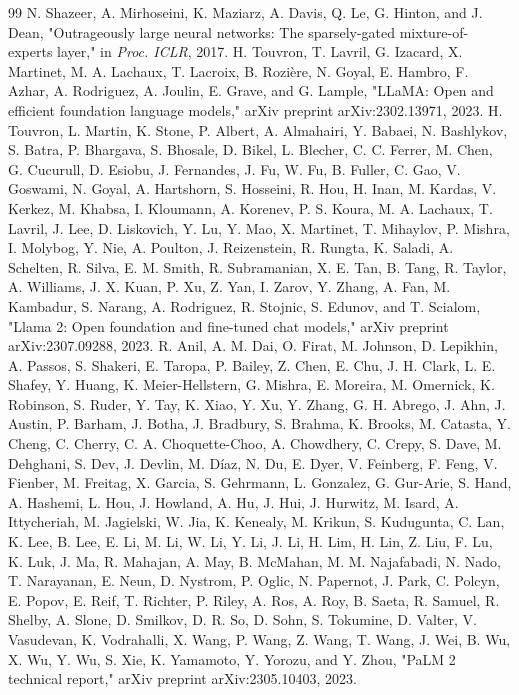 \documentclass[journal]{IEEEtran}
\begin{document}
\begin{thebibliography}{99}
N. Shazeer, A. Mirhoseini, K. Maziarz, A. Davis, Q. Le, G. Hinton, and J. Dean, "Outrageously large neural networks: The sparsely-gated mixture-of-experts layer," in \textit{Proc. ICLR}, 2017.
H. Touvron, T. Lavril, G. Izacard, X. Martinet, M. A. Lachaux, T. Lacroix, B. Rozière, N. Goyal, E. Hambro, F. Azhar, A. Rodriguez, A. Joulin, E. Grave, and G. Lample, "LLaMA: Open and efficient foundation language models," arXiv preprint arXiv:2302.13971, 2023.
H. Touvron, L. Martin, K. Stone, P. Albert, A. Almahairi, Y. Babaei, N. Bashlykov, S. Batra, P. Bhargava, S. Bhosale, D. Bikel, L. Blecher, C. C. Ferrer, M. Chen, G. Cucurull, D. Esiobu, J. Fernandes, J. Fu, W. Fu, B. Fuller, C. Gao, V. Goswami, N. Goyal, A. Hartshorn, S. Hosseini, R. Hou, H. Inan, M. Kardas, V. Kerkez, M. Khabsa, I. Kloumann, A. Korenev, P. S. Koura, M. A. Lachaux, T. Lavril, J. Lee, D. Liskovich, Y. Lu, Y. Mao, X. Martinet, T. Mihaylov, P. Mishra, I. Molybog, Y. Nie, A. Poulton, J. Reizenstein, R. Rungta, K. Saladi, A. Schelten, R. Silva, E. M. Smith, R. Subramanian, X. E. Tan, B. Tang, R. Taylor, A. Williams, J. X. Kuan, P. Xu, Z. Yan, I. Zarov, Y. Zhang, A. Fan, M. Kambadur, S. Narang, A. Rodriguez, R. Stojnic, S. Edunov, and T. Scialom, "Llama 2: Open foundation and fine-tuned chat models," arXiv preprint arXiv:2307.09288, 2023.
R. Anil, A. M. Dai, O. Firat, M. Johnson, D. Lepikhin, A. Passos, S. Shakeri, E. Taropa, P. Bailey, Z. Chen, E. Chu, J. H. Clark, L. E. Shafey, Y. Huang, K. Meier-Hellstern, G. Mishra, E. Moreira, M. Omernick, K. Robinson, S. Ruder, Y. Tay, K. Xiao, Y. Xu, Y. Zhang, G. H. Abrego, J. Ahn, J. Austin, P. Barham, J. Botha, J. Bradbury, S. Brahma, K. Brooks, M. Catasta, Y. Cheng, C. Cherry, C. A. Choquette-Choo, A. Chowdhery, C. Crepy, S. Dave, M. Dehghani, S. Dev, J. Devlin, M. Díaz, N. Du, E. Dyer, V. Feinberg, F. Feng, V. Fienber, M. Freitag, X. Garcia, S. Gehrmann, L. Gonzalez, G. Gur-Arie, S. Hand, A. Hashemi, L. Hou, J. Howland, A. Hu, J. Hui, J. Hurwitz, M. Isard, A. Ittycheriah, M. Jagielski, W. Jia, K. Kenealy, M. Krikun, S. Kudugunta, C. Lan, K. Lee, B. Lee, E. Li, M. Li, W. Li, Y. Li, J. Li, H. Lim, H. Lin, Z. Liu, F. Lu, K. Luk, J. Ma, R. Mahajan, A. May, B. McMahan, M. M. Najafabadi, N. Nado, T. Narayanan, E. Neun, D. Nystrom, P. Oglic, N. Papernot, J. Park, C. Polcyn, E. Popov, E. Reif, T. Richter, P. Riley, A. Ros, A. Roy, B. Saeta, R. Samuel, R. Shelby, A. Slone, D. Smilkov, D. R. So, D. Sohn, S. Tokumine, D. Valter, V. Vasudevan, K. Vodrahalli, X. Wang, P. Wang, Z. Wang, T. Wang, J. Wei, B. Wu, X. Wu, Y. Wu, S. Xie, K. Yamamoto, Y. Yorozu, and Y. Zhou, "PaLM 2 technical report," arXiv preprint arXiv:2305.10403, 2023.

\end{thebibliography}
\end{document}
